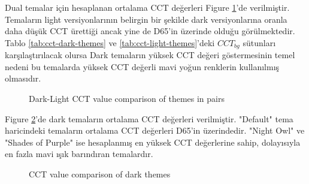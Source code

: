 \documentclass{article}
\begin{document}
Dual temalar için hesaplanan ortalama CCT değerleri Figure \ref{fig:dark-light-pair-compare}'de verilmiştir. Temaların
light versiyonlarının belirgin bir şekilde dark versiyonlarına oranla daha düşük CCT ürettiği ancak yine de D65'in
üzerinde olduğu görülmektedir. Tablo \ref{tab:cct-dark-themes} ve \ref{tab:cct-light-themes}'deki $CCT_{bg}$ sütunları
karşılaştırılacak olursa Dark temaların yüksek CCT değeri göstermesinin temel nedeni bu temalarda yüksek CCT değerli
mavi yoğun renklerin kullanılmış olmasıdır.

\dualtable
\pgfplotstabletranspose[colnames from=themes]\tabledual{\dualtable}

\begin{figure}[h]
  \caption{Dark-Light CCT value comparison of themes in pairs}
  \label{fig:dark-light-pair-compare}
\end{figure}

Figure \ref{fig:dark-compare}'de dark temaların ortalama CCT değerleri verilmiştir. "Default" tema haricindeki temaların
ortalama CCT değerleri D65'in üzerindedir. "Night Owl" ve "Shades of Purple" ise hesaplanmış en yüksek CCT değerlerine
sahip, dolayısıyla en fazla mavi ışık barındıran temalardır.

\darktable
\pgfplotstabletranspose[colnames from=themes]\tabledark{\darktable}

\begin{figure}[htbp]
  \caption{CCT value comparison of dark themes}
  \label{fig:dark-compare}
\end{figure}
\end{document}

